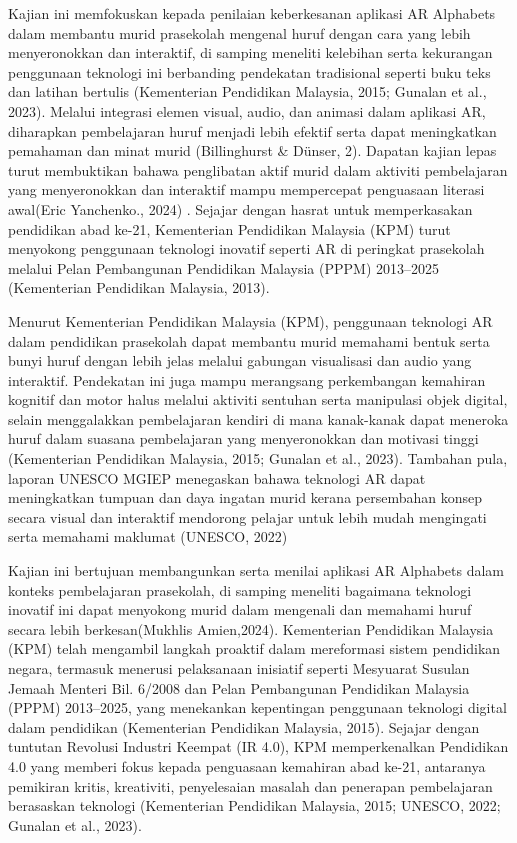 \hspace{1cm}Kajian ini memfokuskan kepada penilaian keberkesanan aplikasi AR Alphabets dalam membantu murid prasekolah mengenal huruf dengan cara yang lebih menyeronokkan dan interaktif, di samping meneliti kelebihan serta kekurangan penggunaan teknologi ini berbanding pendekatan tradisional seperti buku teks dan latihan bertulis (Kementerian Pendidikan Malaysia, 2015; Gunalan et al., 2023). Melalui integrasi elemen visual, audio, dan animasi dalam aplikasi AR, diharapkan pembelajaran huruf menjadi lebih efektif serta dapat meningkatkan pemahaman dan minat murid (Billinghurst \& Dünser, 2). Dapatan kajian lepas turut membuktikan bahawa penglibatan aktif murid dalam aktiviti pembelajaran yang menyeronokkan dan interaktif mampu mempercepat penguasaan literasi awal(Eric Yanchenko., 2024) . Sejajar dengan hasrat untuk memperkasakan pendidikan abad ke-21, Kementerian Pendidikan Malaysia (KPM) turut menyokong penggunaan teknologi inovatif seperti AR di peringkat prasekolah melalui Pelan Pembangunan Pendidikan Malaysia (PPPM) 2013--2025 (Kementerian Pendidikan Malaysia, 2013).

\hspace{1cm}Menurut Kementerian Pendidikan Malaysia (KPM), penggunaan teknologi AR dalam pendidikan prasekolah dapat membantu murid memahami bentuk serta bunyi huruf dengan lebih jelas melalui gabungan visualisasi dan audio yang interaktif. Pendekatan ini juga mampu merangsang perkembangan kemahiran kognitif dan motor halus melalui aktiviti sentuhan serta manipulasi objek digital, selain menggalakkan pembelajaran kendiri di mana kanak-kanak dapat meneroka huruf dalam suasana pembelajaran yang menyeronokkan dan motivasi tinggi (Kementerian Pendidikan Malaysia, 2015; Gunalan et al., 2023). Tambahan pula, laporan UNESCO MGIEP menegaskan bahawa teknologi AR dapat meningkatkan tumpuan dan daya ingatan murid kerana persembahan konsep secara visual dan interaktif mendorong pelajar untuk lebih mudah mengingati serta memahami maklumat (UNESCO, 2022)


\hspace{1cm}Kajian ini bertujuan membangunkan serta menilai aplikasi AR Alphabets dalam konteks pembelajaran prasekolah, di samping meneliti bagaimana teknologi inovatif ini dapat menyokong murid dalam mengenali dan memahami huruf secara lebih berkesan(Mukhlis Amien,2024). Kementerian Pendidikan Malaysia (KPM) telah mengambil langkah proaktif dalam mereformasi sistem pendidikan negara, termasuk menerusi pelaksanaan inisiatif seperti Mesyuarat Susulan Jemaah Menteri Bil. 6/2008 dan Pelan Pembangunan Pendidikan Malaysia (PPPM) 2013--2025, yang menekankan kepentingan penggunaan teknologi digital dalam pendidikan (Kementerian Pendidikan Malaysia, 2015). Sejajar dengan tuntutan Revolusi Industri Keempat (IR 4.0), KPM memperkenalkan Pendidikan 4.0 yang memberi fokus kepada penguasaan kemahiran abad ke-21, antaranya pemikiran kritis, kreativiti, penyelesaian masalah dan penerapan pembelajaran berasaskan teknologi (Kementerian Pendidikan Malaysia, 2015; UNESCO, 2022; Gunalan et al., 2023).

